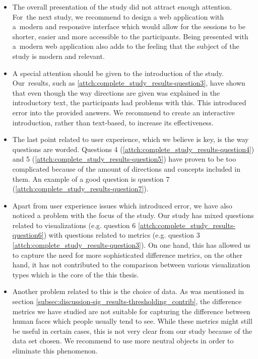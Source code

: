 \begin{itemize}
	\item The overall presentation of the study did not attract enough attention. For~the next study, we recommend to design a web application with a~modern and responsive interface which would allow for the sessions to be shorter, easier and more accessible to the participants. Being presented with a~modern web application also adds to the feeling that the subject of the study is modern and relevant.
	\item A special attention should be given to the introduction of the study. Our~results, such as \ref{attch:complete_study_results-question3}, have shown that even though the way directions are given was explained in the introductory text, the participants had problems with this. This introduced error into the provided answers. We recommend to create an interactive introduction, rather than text-based, to increase its effectiveness.
	\item The last point related to user experience, which we believe is key, is the way questions are worded. Questions 4 (\ref{attch:complete_study_results-question4}) and 5 (\ref{attch:complete_study_results-question5}) have proven to be too complicated because of the amount of directions and concepts included in them. An example of a good question is question 7 (\ref{attch:complete_study_results-question7}).
	\item Apart from user experience issues which introduced error, we have also noticed a problem with the focus of the study. Our study has mixed questions related to visualizations (e.g. question 6 \ref{attch:complete_study_results-question6}) with questions related to metrics (e.g. question 3 \ref{attch:complete_study_results-question3}). On one hand, this has allowed us to capture the need for more sophisticated difference metrics, on the other hand, it has not contributed to the comparison between various visualization types which is the core of the this thesis.
	\item Another problem related to this is the choice of data. As was mentioned in section \ref{subsec:discussion-sig_results-thresholding_contrib}, the difference metrics we have studied are not suitable for capturing the difference between human faces which people usually tend to see. While these metrics might still be useful in certain cases, this is not very clear from our study because of the data set chosen. We recommend to use more neutral objects in order to eliminate this phenomenon.
\end{itemize}

